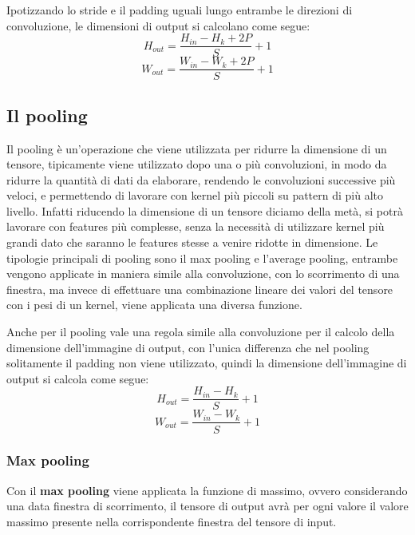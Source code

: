 Ipotizzando lo stride e il padding uguali lungo entrambe le direzioni di convoluzione, le dimensioni di output si calcolano come segue:
\begin{equation}
    H_{out} = \frac{H_{in} - H_{k} + 2P}{S} + 1
\end{equation}
\begin{equation}
    W_{out} = \frac{W_{in} - W_{k} + 2P}{S} + 1
\end{equation}


\subsection{Il pooling}
Il pooling è un'operazione che viene utilizzata per ridurre la dimensione di un tensore, tipicamente viene utilizzato dopo una o più convoluzioni,
in modo da ridurre la quantità di dati da elaborare, rendendo le convoluzioni successive più veloci, e permettendo di lavorare con kernel più piccoli
su pattern di più alto livello. Infatti riducendo la dimensione di un tensore diciamo della metà, si potrà lavorare con features più complesse,
senza la necessità di utilizzare kernel più grandi dato che saranno le features stesse a venire ridotte in dimensione.
Le tipologie principali di pooling sono il max pooling e l'average pooling, entrambe vengono applicate in maniera simile alla convoluzione,
con lo scorrimento di una finestra, ma invece di effettuare una combinazione lineare dei valori del tensore con i pesi di un kernel, 
viene applicata una diversa funzione.

Anche per il pooling vale una regola simile alla convoluzione per il calcolo della dimensione dell'immagine di output, con l'unica differenza che nel
pooling solitamente il padding non viene utilizzato, quindi la dimensione dell'immagine di output si calcola come segue:
\begin{equation}
    H_{out} = \frac{H_{in} - H_{k}}{S} + 1
\end{equation}
\begin{equation}
    W_{out} = \frac{W_{in} - W_{k}}{S} + 1
\end{equation}

\subsubsection{Max pooling}
Con il \textbf{max pooling} viene applicata la funzione di massimo, ovvero considerando una data finestra di scorrimento, il tensore di output avrà
per ogni valore il valore massimo presente nella corrispondente finestra del tensore di input.

